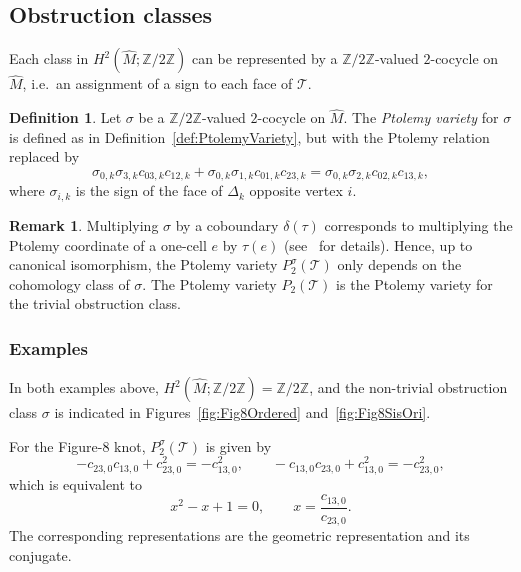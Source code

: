 \documentclass[12pt]{amsart}
\theoremstyle{definition}
\newtheorem{definition}[theorem]{Definition}
\newtheorem{remark}[theorem]{Remark}
\numberwithin{equation}{section}
\def\Z{\mathbb{Z}}
\def\T{\mathcal{T}}
\begin{document}
\subsection{Obstruction classes}\label{sec:ObstructionClasses}
Each class in $H^2(\widehat M;\Z/2\Z)$ can be represented by a $\Z/2\Z$-valued $2$-cocycle on $\widehat M$, i.e.~an assignment of a sign to each face of $\T$.  %
\begin{definition} Let $\sigma$ be a $\Z/2\Z$-valued $2$-cocycle on $\widehat M$. The \emph{Ptolemy variety} for $\sigma$ is defined as in Definition~\ref{def:PtolemyVariety}, but with the Ptolemy relation replaced by
\begin{equation}\label{eq:PtolemyRelationObstruction}
\sigma_{0,k}\sigma_{3,k}c_{03,k}c_{12,k}+\sigma_{0,k}\sigma_{1,k}c_{01,k}c_{23,k}=\sigma_{0,k}\sigma_{2,k}c_{02,k}c_{13,k},
\end{equation}
where $\sigma_{i,k}$ is the sign of the face of $\Delta_k$ opposite vertex $i$.
\end{definition}
\begin{remark} Multiplying $\sigma$ by a coboundary $\delta(\tau)$ corresponds to multiplying the Ptolemy coordinate of a one-cell $e$ by $\tau(e)$ (see~\cite{GaroufalidisThurstonZickert} for details). Hence, up to canonical isomorphism, the Ptolemy variety $P^\sigma_2(\T)$ only depends on the cohomology class of $\sigma$. The Ptolemy variety $P_2(\T)$ is the Ptolemy variety for the trivial obstruction class.
\end{remark}

\subsubsection{Examples}
In both examples above, $H^2(\widehat M;\Z/2\Z)=\Z/2\Z$, and the non-trivial obstruction class $\sigma$ is indicated in Figures~\ref{fig:Fig8Ordered} and~\ref{fig:Fig8SisOri}.

For the Figure-$8$ knot, $P^{\sigma}_2(\T)$ is given by
\begin{equation}\label{eq:Fig8PtolemyNontrivial}
-c_{23,0}c_{13,0}+c_{23,0}^2=-c_{13,0}^2,\qquad -c_{13,0}c_{23,0}+c_{13,0}^2=-c_{23,0}^2,
\end{equation}
which is equivalent to
\begin{equation}
x^2-x+1=0,\qquad x=\frac{c_{13,0}}{c_{23,0}}.
\end{equation} 
The corresponding representations are the geometric representation and its conjugate.
\end{document}
